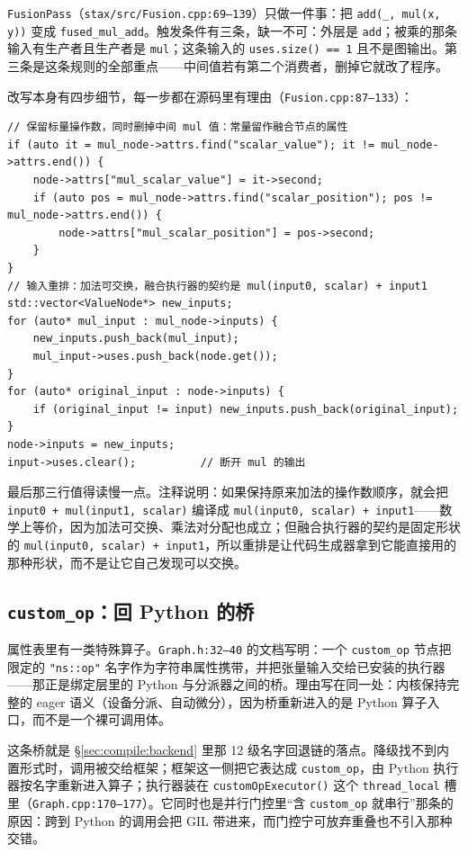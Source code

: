 \texttt{FusionPass}（\texttt{stax/src/Fusion.cpp:69--139}）只做一件事：把 \texttt{add(\_,\ mul(x, y))} 变成 \texttt{fused\_mul\_add}。触发条件有三条，缺一不可：外层是 \texttt{add}；被乘的那条输入有生产者且生产者是 \texttt{mul}；这条输入的 \texttt{uses.size() == 1} 且不是图输出。第三条是这条规则的全部重点——中间值若有第二个消费者，删掉它就改了程序。

改写本身有四步细节，每一步都在源码里有理由（\texttt{Fusion.cpp:87--133}）：

\begin{lstlisting}[caption={融合改写（\texttt{stax/src/Fusion.cpp:87--133}，节选）。}, label=lst:ng:fusion, style=cppstyle]
// 保留标量操作数，同时删掉中间 mul 值：常量留作融合节点的属性
if (auto it = mul_node->attrs.find("scalar_value"); it != mul_node->attrs.end()) {
    node->attrs["mul_scalar_value"] = it->second;
    if (auto pos = mul_node->attrs.find("scalar_position"); pos != mul_node->attrs.end()) {
        node->attrs["mul_scalar_position"] = pos->second;
    }
}
// 输入重排：加法可交换，融合执行器的契约是 mul(input0, scalar) + input1
std::vector<ValueNode*> new_inputs;
for (auto* mul_input : mul_node->inputs) {
    new_inputs.push_back(mul_input);
    mul_input->uses.push_back(node.get());
}
for (auto* original_input : node->inputs) {
    if (original_input != input) new_inputs.push_back(original_input);
}
node->inputs = new_inputs;
input->uses.clear();          // 断开 mul 的输出
\end{lstlisting}

最后那三行值得读慢一点。注释说明：如果保持原来加法的操作数顺序，就会把 \texttt{input0 + mul(input1, scalar)} 编译成 \texttt{mul(input0, scalar) + input1}——数学上等价，因为加法可交换、乘法对分配也成立；但融合执行器的契约是固定形状的 \texttt{mul(input0, scalar) + input1}，所以重排是让代码生成器拿到它能直接用的那种形状，而不是让它自己发现可以交换。

\subsection{\texorpdfstring{\texttt{custom\_op}}{custom\_op}：回 Python 的桥}

属性表里有一类特殊算子。\texttt{Graph.h:32--40} 的文档写明：一个 \texttt{custom\_op} 节点把限定的 \texttt{"ns::op"} 名字作为字符串属性携带，并把张量输入交给已安装的执行器——那正是绑定层里的 Python 与分派器之间的桥。理由写在同一处：内核保持完整的 eager 语义（设备分派、自动微分），因为桥重新进入的是 Python 算子入口，而不是一个裸可调用体。

这条桥就是 \S\ref{sec:compile:backend} 里那 12 级名字回退链的落点。降级找不到内置形式时，调用被交给框架；框架这一侧把它表达成 \texttt{custom\_op}，由 Python 执行器按名字重新进入算子；执行器装在 \texttt{customOpExecutor()} 这个 \texttt{thread\_local} 槽里（\texttt{Graph.cpp:170--177}）。它同时也是并行门控里“含 \texttt{custom\_op} 就串行”那条的原因：跨到 Python 的调用会把 GIL 带进来，而门控宁可放弃重叠也不引入那种交错。

